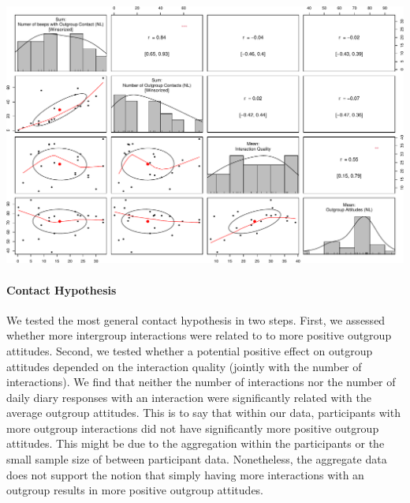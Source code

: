 \begin{Shaded}
\begin{Highlighting}[]
\NormalTok{(}
\SpecialCharTok{$}\SpecialCharTok{\%\textgreater{}\%} 
   \NormalTok{(}
    \NormalTok{,}
    \NormalTok{,}
    \NormalTok{,}
\NormalTok{  )}
\NormalTok{)}
\end{Highlighting}
\end{Shaded}

\includegraphics{Figures/WorkerFreqAttCor-2.pdf}

\paragraph{Contact Hypothesis}

We tested the most general contact hypothesis in two steps. First, we
assessed whether more intergroup interactions were related to to more
positive outgroup attitudes. Second, we tested whether a potential
positive effect on outgroup attitudes depended on the interaction
quality (jointly with the number of interactions). We find that neither
the number of interactions nor the number of daily diary responses with
an interaction were significantly related with the average outgroup
attitudes. This is to say that within our data, participants with more
outgroup interactions did not have significantly more positive outgroup
attitudes. This might be due to the aggregation within the participants
or the small sample size of between participant data. Nonetheless, the
aggregate data does not support the notion that simply having more
interactions with an outgroup results in more positive outgroup
attitudes.

